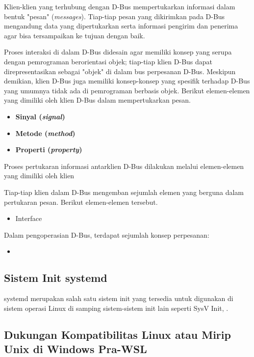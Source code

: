 Klien-klien yang terhubung dengan D-Bus mempertukarkan informasi dalam bentuk "pesan" (\textit{messages}). Tiap-tiap pesan yang dikirimkan pada D-Bus mengandung data yang dipertukarkan serta informasi pengirim dan penerima agar bisa tersampaikan ke tujuan dengan baik.

Proses interaksi di dalam D-Bus didesain agar memiliki konsep yang serupa dengan pemrograman berorientasi objek; tiap-tiap klien D-Bus dapat direpresentasikan sebagai "objek" di dalam bus perpesanan D-Bus. Meskipun demikian, klien D-Bus juga memiliki konsep-konsep yang spesifik terhadap D-Bus yang umumnya tidak ada di pemrograman berbasis objek. Berikut elemen-elemen yang dimiliki oleh klien D-Bus dalam mempertukarkan pesan.
\begin{itemize}
    \item \textbf{Sinyal (\textit{signal})}\\

    \item \textbf{Metode (\textit{method})}\\

    \item \textbf{Properti (\textit{property})}\\
\end{itemize}

Proses pertukaran informasi antarklien D-Bus dilakukan melalui elemen-elemen yang dimiliki oleh klien

Tiap-tiap klien dalam D-Bus mengemban sejumlah elemen yang berguna dalam pertukaran pesan. Berikut elemen-elemen tersebut.
\begin{itemize}
    \item Interface
\end{itemize}

Dalam pengoperasian D-Bus, terdapat sejumlah konsep perpesanan:
\begin{itemize}
    \item 
\end{itemize}

\subsection{Sistem Init systemd}

systemd merupakan salah satu sistem init yang tersedia untuk digunakan di sistem operasi Linux di samping sistem-sistem init lain seperti SysV Init, .

\subsection{Dukungan Kompatibilitas Linux atau Mirip Unix di Windows Pra-WSL}

